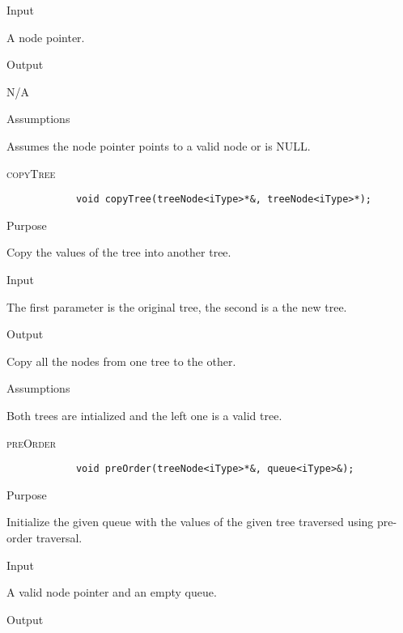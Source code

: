 \documentclass[pdftex, 12pt]{article}
\begin{document}
\begin{description}
\begin{description}
			\item{Input}

				A node pointer.

			\item{Output}

				N/A

			\item{Assumptions}

				Assumes the node pointer points to a valid node or is NULL.

		\end{description}
	\item{\textsc{copyTree}}
		\begin{lstlisting}
			void copyTree(treeNode<iType>*&, treeNode<iType>*);
		\end{lstlisting}
		\begin{description}

			\item{Purpose}

				Copy the values of the tree into another tree.

			\item{Input}

				The first parameter is the original tree, the second is a the new tree.

			\item{Output}

				Copy all the nodes from one tree to the other.

			\item{Assumptions}

				Both trees are intialized and the left one is a valid tree.

		\end{description}
	\item{\textsc{preOrder}}
		\begin{lstlisting}
			void preOrder(treeNode<iType>*&, queue<iType>&);
		\end{lstlisting}
		\begin{description}

			\item{Purpose}
				
				Initialize the given queue with the values of the given tree traversed using pre-order traversal.

			\item{Input}

				A valid node pointer and an empty queue.

			\item{Output}


\end{description}
\end{description}
\end{document}
